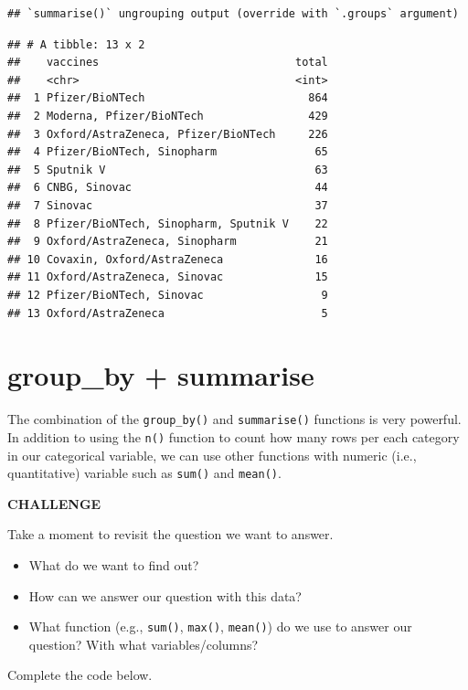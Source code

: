 \documentclass[
]{book}
\newenvironment{Shaded}{\begin{snugshade}}{\end{snugshade}}
\newcommand{\DataTypeTok}[1]{\textcolor[rgb]{0.13,0.29,0.53}{#1}}
\newcommand{\KeywordTok}[1]{\textcolor[rgb]{0.13,0.29,0.53}{\textbf{#1}}}
\newcommand{\NormalTok}[1]{#1}
\newcommand{\OperatorTok}[1]{\textcolor[rgb]{0.81,0.36,0.00}{\textbf{#1}}}
\newcommand{\OtherTok}[1]{\textcolor[rgb]{0.56,0.35,0.01}{#1}}
\newcommand{\StringTok}[1]{\textcolor[rgb]{0.31,0.60,0.02}{#1}}
\begin{document}
\begin{verbatim}
## `summarise()` ungrouping output (override with `.groups` argument)
\end{verbatim}

\begin{verbatim}
## # A tibble: 13 x 2
##    vaccines                              total
##    <chr>                                 <int>
##  1 Pfizer/BioNTech                         864
##  2 Moderna, Pfizer/BioNTech                429
##  3 Oxford/AstraZeneca, Pfizer/BioNTech     226
##  4 Pfizer/BioNTech, Sinopharm               65
##  5 Sputnik V                                63
##  6 CNBG, Sinovac                            44
##  7 Sinovac                                  37
##  8 Pfizer/BioNTech, Sinopharm, Sputnik V    22
##  9 Oxford/AstraZeneca, Sinopharm            21
## 10 Covaxin, Oxford/AstraZeneca              16
## 11 Oxford/AstraZeneca, Sinovac              15
## 12 Pfizer/BioNTech, Sinovac                  9
## 13 Oxford/AstraZeneca                        5
\end{verbatim}

\hypertarget{group_by-summarise}{%
\section{group\_by + summarise}\label{group_by-summarise}}

The combination of the \texttt{group\_by()} and \texttt{summarise()} functions is very powerful. In addition to using the \texttt{n()} function to count how many rows per each category in our categorical variable, we can use other functions with numeric (i.e., quantitative) variable such as \texttt{sum()} and \texttt{mean()}.

\textbf{CHALLENGE}

Take a moment to revisit the question we want to answer.

\begin{itemize}
\item
  What do we want to find out?
\item
  How can we answer our question with this data?
\item
  What function (e.g., \texttt{sum()}, \texttt{max()}, \texttt{mean()}) do we use to answer our question? With what variables/columns?
\end{itemize}

Complete the code below.

\begin{Shaded}
\end{Shaded}
\end{document}
